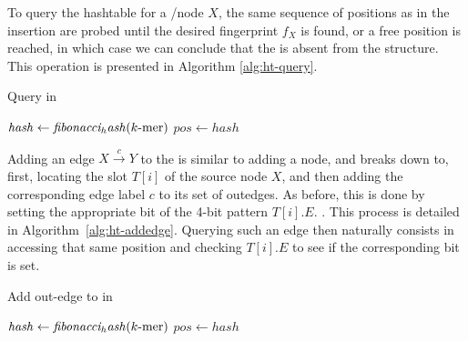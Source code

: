 
To query the hashtable for a \kmer/node $X$, the same sequence of positions as in the insertion are probed until the desired fingerprint $f_X$ is found, or a free position is reached, in which case we can conclude that the \kmer is absent from the structure. This operation is presented in Algorithm \ref{alg:ht-query}.

\begin{algorithm}
	\caption{Query \kmer in \dBHT}\label{alg:ht-query}
	$\mathit{hash} \gets \mathit{fibonacci_hash}(\mbox{$k$-mer})$\;
	$\mathit{pos} \gets \mathit{hash}$\;
\end{algorithm}


Adding an edge $X\stackrel{c}{\longrightarrow}Y$ to the \dBHT is similar to adding a \kmer node, and breaks down to, first, locating the slot $T[i]$ of the source node $X$, and then adding the corresponding edge label $c$ to its set of outedges. As before, this is done by setting the appropriate bit of the  4-bit pattern $T[i].E$. . This process is detailed in Algorithm~\ref{alg:ht-addedge}.   Querying such an edge then naturally consists in accessing that same position and checking $T[i].E$ to see if the corresponding bit is set. 


\begin{algorithm}
  \caption{Add out-edge to \kmer in \dBHT}\label{alg:ht-addedge}
  $\mathit{hash} \gets \mathit{fibonacci_hash}(\mbox{$k$-mer})$\;
  $\mathit{pos} \gets \mathit{hash}$\;
\end{algorithm}


